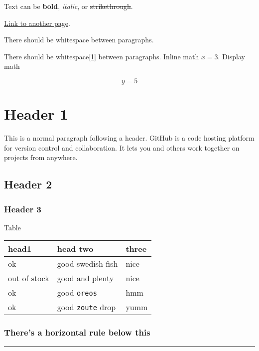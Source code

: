 \documentclass[a4paper,12pt]{article}
\begin{document}
      {
          \hypersetup{linkcolor=}
        \setcounter{tocdepth}{3}
    \tableofcontents
  }
  \newpage
Text can be \textbf{bold}, \emph{italic}, or \sout{strikethrough}.

\href{https://another-page.html}{Link to another page}.

There should be whitespace between paragraphs.

There should be whitespace\protect\hyperlink{ref-testcite}{{[}1{]}}
between paragraphs. Inline math \(x=3\). Display math

\[y=5\]

\hypertarget{header-1}{%
\section{Header 1}\label{header-1}}

This is a normal paragraph following a header. GitHub is a code hosting
platform for version control and collaboration. It lets you and others
work together on projects from anywhere.

\hypertarget{header-2}{%
\subsection{Header 2}\label{header-2}}

\hypertarget{header-3}{%
\subsubsection{Header 3}\label{header-3}}

Table

\begin{longtable}[]{@{}lll@{}}
\toprule
head1 & head two & three\tabularnewline
\midrule
\endhead
ok & good swedish fish & nice\tabularnewline
out of stock & good and plenty & nice\tabularnewline
ok & good \texttt{oreos} & hmm\tabularnewline
ok & good \texttt{zoute} drop & yumm\tabularnewline
\bottomrule
\end{longtable}

\hypertarget{theres-a-horizontal-rule-below-this}{%
\subsubsection{There's a horizontal rule below
this}\label{theres-a-horizontal-rule-below-this}}

\begin{center}\rule{0.5\linewidth}{0.5pt}\end{center}
\end{document}
